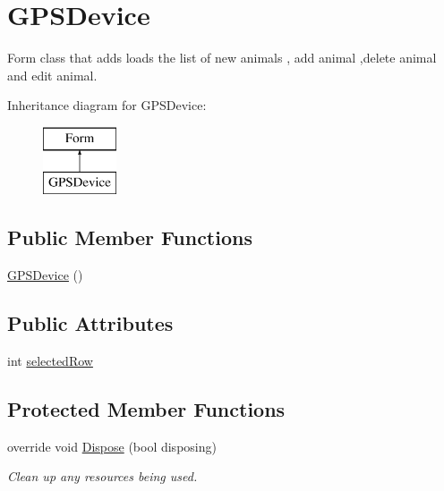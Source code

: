 \hypertarget{classWildlifeTrackingApp_1_1GPSDevice}{}\section{G\+P\+S\+Device}
\label{classWildlifeTrackingApp_1_1GPSDevice}


Form class that adds loads the list of new animals , add animal ,delete animal and edit animal.  


Inheritance diagram for G\+P\+S\+Device\+:\begin{figure}[H]
\begin{center}
\leavevmode
\includegraphics[height=2.000000cm]{classWildlifeTrackingApp_1_1GPSDevice}
\end{center}
\end{figure}
\subsection*{Public Member Functions}
\begin{DoxyCompactItemize}
\item 
\hyperlink{classWildlifeTrackingApp_1_1GPSDevice_a4642693badcba7273e5031b821d3656c}{G\+P\+S\+Device} ()
\end{DoxyCompactItemize}
\subsection*{Public Attributes}
\begin{DoxyCompactItemize}
\item 
int \hyperlink{classWildlifeTrackingApp_1_1GPSDevice_aad96a74a8e07bceb571a64a3355b779d}{selected\+Row}
\end{DoxyCompactItemize}
\subsection*{Protected Member Functions}
\begin{DoxyCompactItemize}
\item 
override void \hyperlink{classWildlifeTrackingApp_1_1GPSDevice_a849c3c7f8d08104f0cdb46bee9fe6389}{Dispose} (bool disposing)
\begin{DoxyCompactList}\small\item\em Clean up any resources being used. \end{DoxyCompactList}\end{DoxyCompactItemize}
